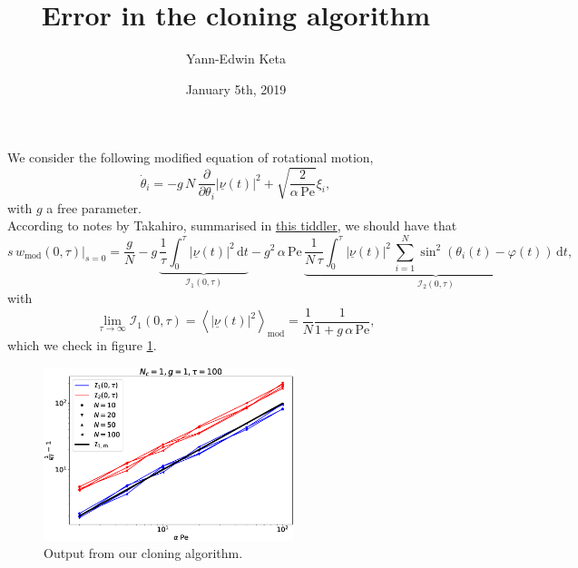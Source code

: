 \documentclass[10pt]{article}
\title{\bf Error in the cloning algorithm}
\author{Yann-Edwin Keta}
\date{January 5th, 2019}
\begin{document}
\maketitle

We consider the following modified equation of rotational motion,
\begin{equation}
\dot{\theta}_i = - g \, N \, \frac{\partial}{\partial \theta_i} |\underline{\nu}(t)|^2 + \sqrt{\frac{2}{\alpha \, \text{Pe}}} \xi_i,
\end{equation}
with $g$ a free parameter.\\

According to notes by Takahiro, summarised in \href{https://yketa.github.io/DAMTP_2019_Wiki/#ABP%20cloning%20algorithm}{this tiddler}, we should have that
\begin{equation}
\left. s \, w_{\text{mod}}(0, \tau) \right|_{s=0} =  \frac{g}{N} - g \,\underbrace{\frac{1}{\tau} \int_0^{\tau} |\underline{\nu}(t)|^2 \, \text{d}t}_{\mathcal{I}_1(0, \tau)} - g^2 \, \alpha \, \text{Pe} \, \underbrace{\frac{1}{N \, \tau} \int_0^{\tau} |\underline{\nu}(t)|^2 \, \sum_{i=1}^N \sin^2(\theta_i(t) - \varphi(t)) \, \text{d}t}_{\mathcal{I}_2(0, \tau)},
\label{swmod}
\end{equation}
with
\begin{equation}
\lim_{\tau \rightarrow \infty} \mathcal{I}_1(0, \tau) = \left<|\underline{\nu}(t)|^2\right>_{\text{mod}} = \frac{1}{N}\frac{1}{1 + g \, \alpha \, \text{Pe}},
\label{I1}
\end{equation}
which we check in figure \ref{testI1}.

\begin{figure}[H]
\centering
\includegraphics[width=0.65\textwidth]{testI1.eps}
\caption{Output from our cloning algorithm.}
\label{testI1}
\end{figure}
\end{document}
